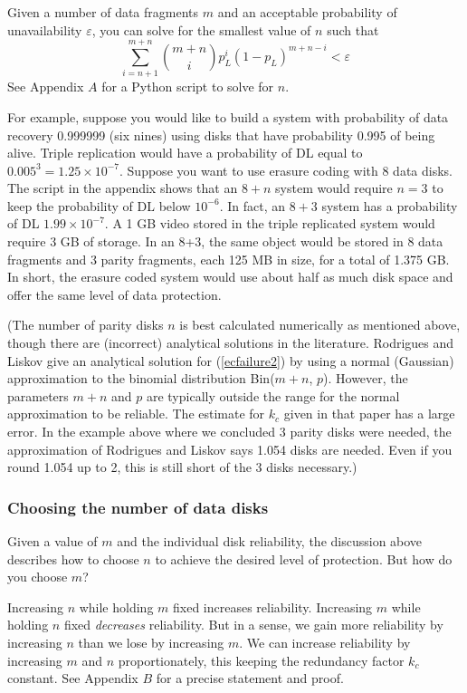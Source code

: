 \documentclass[11pt]{article}
\begin{document}
Given a number of data fragments $m$ and an acceptable probability of unavailability $\varepsilon$, you can solve for the smallest value of $n$ such that
\begin{equation}
\sum_{i=n+1}^{m+n} {m+n \choose i} p_L^i (1-p_L)^{m+n-i} < \varepsilon \label{ecfailure2}
\end{equation}
See Appendix $A$ for a Python script to solve for $n$. 

For example, suppose you would like to build a system with probability of data recovery 0.999999 (six nines) using disks that have probability 0.995 of being alive. Triple replication would have a probability of DL equal to $0.005^3 = 1.25 \times 10^{-7}$. Suppose you want to use erasure coding with 8 data disks. The script in the appendix shows that an $8+n$ system would require $n=3$ to keep the probability of DL below $10^{-6}$. In fact, an $8+3$ system has a probability of DL $1.99 \times 10^{-7}$. A 1 GB video stored in the triple replicated system would require 3 GB of storage. In an 8+3, the same object would be stored in 8 data fragments and 3 parity fragments, each 125 MB in size, for a total of 1.375 GB. In short, the erasure coded system would use about half as much disk space and offer the same level of data protection.

(The number of parity disks $n$ is best calculated numerically as mentioned above, though there are (incorrect) analytical solutions in the literature. Rodrigues and Liskov \cite{rl} give an analytical solution for (\ref{ecfailure2}) by using a normal (Gaussian) approximation to the binomial distribution Bin($m+n$, $p$). However, the parameters $m+n$ and $p$ are typically outside the range for the normal approximation to be reliable. The estimate for $k_c$ given in that paper has a large error. In the example above where we concluded 3 parity disks were needed, the approximation of Rodrigues and Liskov says 1.054 disks are needed. Even if you round 1.054 up to 2, this is still short of the 3 disks necessary.)

\subsubsection{Choosing the number of data disks}

Given a value of $m$ and the individual disk reliability, the discussion above describes how to choose $n$ to achieve the desired level of protection. But how do you choose $m$?

Increasing $n$ while holding $m$ fixed increases reliability. Increasing $m$ while holding $n$ fixed \emph{decreases} reliability. But in a sense, we gain more reliability by increasing $n$ than we lose by increasing $m$. We can increase reliability by increasing $m$ and $n$ proportionately, this keeping the redundancy factor $k_c$ constant. See Appendix $B$ for a precise statement and proof.
\end{document}

